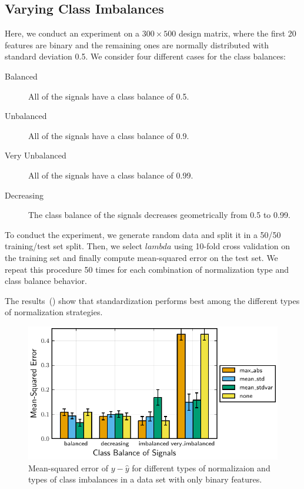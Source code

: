 \subsection{Varying Class Imbalances}

Here, we conduct an experiment on a \(300 \times 500\) design matrix, where the first 20 features are binary and the remaining ones are normally distributed with standard deviation 0.5. We consider four different cases for the class balances:
\begin{description}
  \item[Balanced] All of the signals have a class balance of 0.5.
  \item[Unbalanced] All of the signals have a class balance of 0.9.
  \item[Very Unbalanced] All of the signals have a class balance of 0.99.
  \item[Decreasing] The class balance of the signals decreases geometrically from 0.5 to 0.99.
\end{description}

To conduct the experiment, we generate random data and split it in a 50/50 training/test set split. Then, we select \(lambda\) using 10-fold cross validation on the training set and finally compute mean-squared error on the test set. We repeat this procedure 50 times for each combination of normalization type and class balance behavior.

The results~() show that standardization performs best among the different types of normalization strategies.

\begin{figure}[htpb]
  \centering
  \includegraphics[]{plots/binary_data_sim.pdf}
  \caption{%
    Mean-squared error of \(y - \hat y\) for different types of normalizaion and types of class imbalances in a data set with only binary features.
  }
  \label{fig:binary-sim}
\end{figure}

